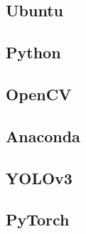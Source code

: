 \subsection{Ubuntu}
\label{sec:ubuntu}

\subsection{Python}
\label{sec:python}

\subsection{OpenCV}
\label{sec:OpenCV}

\subsection{Anaconda}
\label{sec:Anaconda}

\subsection{YOLOv3}
\label{sec:YOLOv3}

\subsection{PyTorch}
\label{sec:PyTorch}


